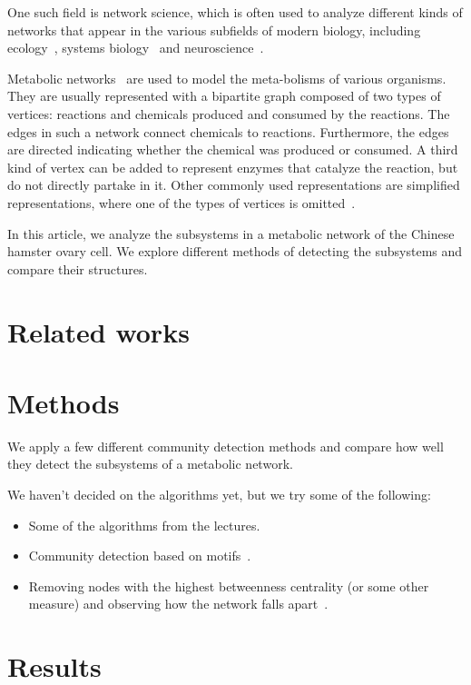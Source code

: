 One such field is network science, which
is often used to analyze different kinds of networks that appear in the various
subfields of modern biology, including ecology~\cite{proulx2005network}, systems
biology~\cite{barabasi2004network} and neuroscience~\cite{sporns2014contributions}.

Metabolic networks~\cite{jeong2000large} are used to model the meta-bolisms of
various organisms. They are usually represented with a bipartite graph composed
of two types of vertices: reactions and chemicals produced and consumed by the
reactions. The edges in such a network connect chemicals to
reactions. Furthermore, the edges are directed indicating whether the chemical
was produced or consumed. A third kind of vertex can be added to represent
enzymes that catalyze the reaction, but do not directly partake in
it. Other commonly used representations are simplified representations, where
one of the types of vertices is omitted~\cite{newman2010networks}.

In this article, we analyze the subsystems in a metabolic network of the
Chinese hamster ovary cell. We explore different methods of detecting the
subsystems and compare their structures.

\section{Related works}

\section{Methods}
\label{sec:methods}

We apply a few different community detection methods and compare how well
they detect the subsystems of a metabolic network.

We haven't decided on the algorithms yet, but we try some of the following:

\begin{itemize}
\item
  Some of the algorithms from the lectures.
\item
  Community detection based on motifs~\cite{benson2016higher}.
\item
  Removing nodes with the highest betweenness centrality (or some other measure)
  and observing how the network falls apart~\cite{holme2003subnetwork}.
\end{itemize}

\section{Results}
\label{sec:results}

